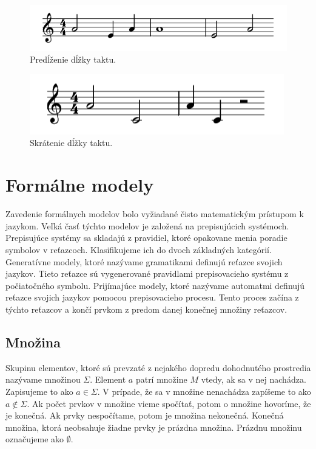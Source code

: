 \begin{itemize}
    
    \begin{figure}[H]
    \centering
    \includegraphics[scale=0.4]{obrazky-figures/Aug.png}
    \caption{Predĺženie dĺžky taktu.}
    \label{fig:augmentacia}
    \end{figure}
    \begin{figure}[H]
    \centering
    \includegraphics[scale=0.4]{obrazky-figures/Dimi.png}
    \caption{Skrátenie dĺžky taktu.}
    \label{fig:Diminution}
    \end{figure}
\end{itemize}

\section{Formálne modely}
Zavedenie formálnych modelov bolo vyžiadané čisto matematickým prístupom k jazykom. Veľká časť týchto modelov je založená na prepisujúcich systémoch. Prepisujúce systémy sa skladajú z pravidiel, ktoré opakovane menia poradie symbolov v reťazcoch. Klasifikujeme ich do dvoch základných kategórií. Generatívne modely, ktoré nazývame gramatikami definujú reťazce svojich jazykov. Tieto reťazce sú vygenerované pravidlami prepisovacieho systému z počiatočného symbolu. Prijímajúce modely, ktoré nazývame automatmi definujú reťazce svojich jazykov pomocou prepisovacieho procesu. Tento proces začína z týchto reťazcov a končí prvkom z predom danej konečnej množiny reťazcov.

\label{sec:formallang}
\subsection{Množina}
Skupinu elementov, ktoré sú prevzaté z nejakého dopredu dohodnutého prostredia nazývame množinou $\Sigma$. Element $a$ patrí množine $M$ vtedy, ak sa v nej nachádza. Zapisujeme to ako $a \in \Sigma$. V prípade, že sa v množine nenachádza zapíšeme to ako $a \not \in  \Sigma$. Ak počet prvkov v množine vieme spočítať, potom o množine hovoríme, že je konečná. Ak prvky nespočítame, potom je množina nekonečná. Konečná množina, ktorá neobsahuje žiadne prvky je prázdna množina. Prázdnu množinu označujeme ako $\emptyset$.

